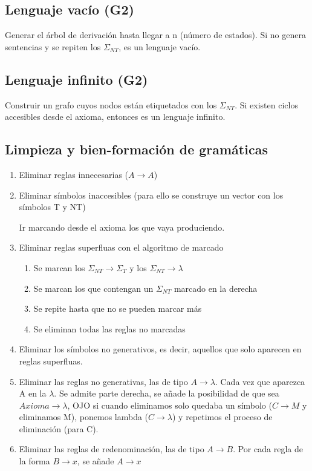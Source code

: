 \documentclass[12pt, twoside, openright]{report} %
\begin{document}
\subsection{Lenguaje vacío (G2)}
Generar el árbol de derivación hasta llegar a n (número de estados). Si no genera
sentencias y se repiten los $\Sigma_{NT}$, es un lenguaje vacío.

\subsection{Lenguaje infinito (G2)}
Construir un grafo cuyos nodos están etiquetados con los $\Sigma_{NT}$. Si existen ciclos
accesibles desde el axioma, entonces es un lenguaje infinito.

\subsection{Limpieza y bien-formación de gramáticas}
\begin{enumerate}
	\item Eliminar reglas innecesarias ($A \rightarrow A$)
	\item Eliminar símbolos inaccesibles (para ello se construye un vector con los símbolos T y NT)

	      Ir marcando desde el axioma los que vaya produciendo.
	\item Eliminar reglas superfluas con el algoritmo de marcado
	      \begin{enumerate}
		      \item Se marcan los $\Sigma_{NT} \rightarrow \Sigma_{T}$ y los $\Sigma_{NT} \rightarrow \lambda$
		      \item Se marcan los que contengan un $\Sigma_{NT}$ marcado en la derecha
		      \item Se repite hasta que no se pueden marcar más
		      \item Se eliminan todas las reglas no marcadas
	      \end{enumerate}
	\item Eliminar los símbolos no generativos, es decir, aquellos que solo aparecen en reglas superfluas.
	\item Eliminar las reglas no generativas, las de tipo $A \rightarrow \lambda$. Cada vez que aparezca A en la $\lambda$. Se admite parte derecha, se añade la posibilidad de que sea $\textit{Axioma} \rightarrow \lambda$, OJO si cuando eliminamos solo quedaba un símbolo ($C \rightarrow M$ y eliminamos M), ponemos lambda ($C \rightarrow \lambda$) y repetimos el proceso de eliminación (para C).
	\item Eliminar las reglas de redenominación, las de tipo $A \rightarrow B$. Por cada regla de la forma $B \rightarrow x$, se añade $A \rightarrow x$
\end{enumerate}
\end{document}
